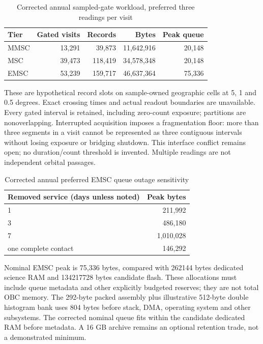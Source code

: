 \begin{table}[H]\centering\small
\caption{Corrected annual sampled-gate workload, preferred three readings per visit}\label{tab:tier-v3}
\begin{tabularx}{\linewidth}{@{}Xrrrr@{}}\toprule
Tier & Gated visits & Records & Bytes & Peak queue\\\midrule
MMSC & 13,291 & 39,873 & 11,642,916 & 20,148\\
MSC & 39,473 & 118,419 & 34,578,348 & 20,148\\
EMSC & 53,239 & 159,717 & 46,637,364 & 75,336\\
\bottomrule\end{tabularx}\end{table}
These are hypothetical record slots on sample-owned geographic cells at 5, 1 and 0.5 degrees. Exact crossing times and actual readout boundaries are unavailable. Every gated interval is retained, including zero-count exposure; partitions are nonoverlapping. Interrupted acquisition imposes a fragmentation floor: more than three segments in a visit cannot be represented as three contiguous intervals without losing exposure or bridging shutdown. This interface conflict remains open; no duration/count threshold is invented. Multiple readings are not independent orbital passages.
\begin{table}[H]\centering\small
\caption{Corrected annual preferred EMSC queue outage sensitivity}\label{tab:corrected-outage}
\begin{tabularx}{\linewidth}{@{}Xr@{}}\toprule
Removed service (days unless noted) & Peak bytes\\\midrule
1 & 211,992\\
3 & 486,180\\
7 & 1,010,028\\
one complete contact & 146,292\\
\bottomrule\end{tabularx}\end{table}
Nominal EMSC peak is 75,336 bytes, compared with 262144 bytes dedicated science RAM and 134217728 bytes candidate flash. These allocations must include queue metadata and other explicitly budgeted reserves; they are not total OBC memory. The 292-byte packed assembly plus illustrative 512-byte double histogram bank uses 804 bytes before stack, DMA, operating system and other subsystems. The corrected nominal queue fits within the candidate dedicated RAM before metadata. A 16 GB archive remains an optional retention trade, not a demonstrated minimum.

